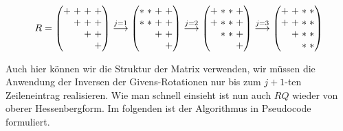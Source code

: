 \documentclass{article}
\theoremstyle{plain}
\begin{document}
\begin{align*}
	\setlength\arraycolsep{1.5pt}
	R
	=
	\begin{pmatrix}
		+ & + & + & + \\
		 & + & + & + \\
		&  & + & + \\
		& & & + \\
	\end{pmatrix}
	\stackrel{j=1}{\longrightarrow}
	\begin{pmatrix}
		* & * & + & + \\
		* & * & + & + \\
		&  & + & + \\
		& & & + \\
	\end{pmatrix}
	\stackrel{j=2}{\longrightarrow}
	\begin{pmatrix}
		+ & * & * & + \\
		+ & * & * & + \\
		& * &*  & + \\
		& & & + \\
	\end{pmatrix}
	\stackrel{j=3}{\longrightarrow}
	\begin{pmatrix}
		+ & + & * & * \\
		+ & + & * & * \\
		& + &*  & * \\
		& & *& * \\
	\end{pmatrix}
\end{align*}

Auch hier können wir die Struktur der Matrix verwenden, wir müssen die Anwendung der Inversen der Givens-Rotationen nur bis zum $j+1$-ten Zeileneintrag realisieren. Wie man schnell einsieht ist nun auch $RQ$ wieder von oberer Hessenbergform. Im folgenden ist der Algorithmus in Pseudocode formuliert.
\end{document}
